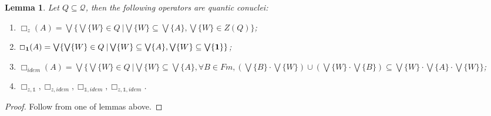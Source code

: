 \documentclass[a4paper]{article}
\newtheorem{lemma}{Lemma}
\begin{document}
\begin{lemma} Let $Q \subseteq \mathcal{Q}$, then the following operators are quantic conuclei:
  \begin{enumerate}
    \item $\Box_z (A) = \bigvee \{ \bigvee \{ W \} \in Q \: | \bigvee \{ W \} \subseteq \bigvee \{ A \}, \bigvee \{ W \} \in Z(Q) \}$;
    \item $\Box_{{\bf 1}} (A) = \bigvee \{ \bigvee \{ W \} \in Q \: | \bigvee \{ W \} \subseteq \bigvee \{ A \}, \bigvee \{ W \} \subseteq \bigvee \{ {\bf 1} \} \}$;
    \item $\Box_{idem} (A) = \bigvee \{ \bigvee \{ W \} \in Q \: | \bigvee \{ W \} \subseteq \bigvee \{ A \}, \forall B \in Fm, (\bigvee \{ B \} \cdot \bigvee \{ W \}) \cup (\bigvee \{ W \} \cdot \bigvee \{ B \}) \subseteq \bigvee \{ W \} \cdot \bigvee \{ A \} \cdot \bigvee \{ W \} \}$;
    \item $\Box_{z, \mathds{1}}, \Box_{z, idem}, \Box_{\mathds{1}, idem}, \Box_{z, \mathds{1}, idem}$.
  \end{enumerate}
\end{lemma}

\begin{proof}
  Follow from one of lemmas above.
\end{proof}
\end{document}

